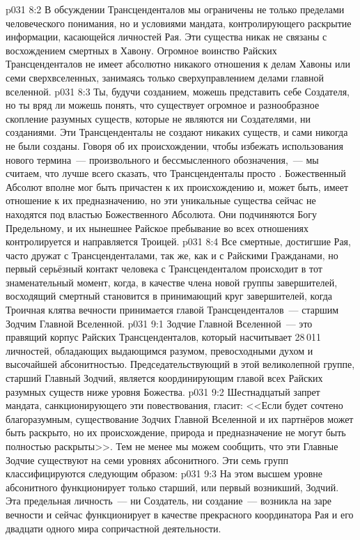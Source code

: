 \vs p031 8:2 В обсуждении Трансценденталов мы ограничены не только пределами человеческого понимания, но и условиями мандата, контролирующего раскрытие информации, касающейся личностей Рая. Эти существа никак не связаны с восхождением смертных в Хавону. Огромное воинство Райских Трансценденталов не имеет абсолютно никакого отношения к делам Хавоны или семи сверхвселенных, занимаясь только сверхуправлением делами главной вселенной.
\vs p031 8:3 Ты, будучи созданием, можешь представить себе Создателя, но ты вряд ли можешь понять, что существует огромное и разнообразное скопление разумных существ, которые не являются ни Создателями, ни созданиями. Эти Трансценденталы не создают никаких существ, и сами никогда не были созданы. Говоря об их происхождении, чтобы избежать использования нового термина~--- произвольного и бессмысленного обозначения,~--- мы считаем, что лучше всего сказать, что Трансценденталы просто . Божественный Абсолют вполне мог быть причастен к их происхождению и, может быть, имеет отношение к их предназначению, но эти уникальные существа сейчас не находятся под властью Божественного Абсолюта. Они подчиняются Богу Предельному, и их нынешнее Райское пребывание во всех отношениях контролируется и направляется Троицей.
\vs p031 8:4 Все смертные, достигшие Рая, часто дружат с Трансценденталами, так же, как и с Райскими Гражданами, но первый серьёзный контакт человека с Трансценденталом происходит в тот знаменательный момент, когда, в качестве члена новой группы завершителей, восходящий смертный становится в принимающий круг завершителей, когда Троичная клятва вечности принимается главой Трансценденталов~--- старшим Зодчим Главной Вселенной.
\vs p031 9:1 Зодчие Главной Вселенной~--- это правящий корпус Райских Трансценденталов, который насчитывает 28\,011 личностей, обладающих выдающимся разумом, превосходными духом и высочайшей абсонитностью. Председательствующий в этой великолепной группе, старший Главный Зодчий, является координирующим главой всех Райских разумных существ ниже уровня Божества.
\vs p031 9:2 Шестнадцатый запрет мандата, санкционирующего эти повествования, гласит: <<Если будет сочтено благоразумным, существование Зодчих Главной Вселенной и их партнёров может быть раскрыто, но их происхождение, природа и предназначение не могут быть полностью раскрыты>>. Тем не менее мы можем сообщить, что эти Главные Зодчие существуют на семи уровнях абсонитного. Эти семь групп классифицируются следующим образом:
\vs p031 9:3  На этом высшем уровне абсонитного функционирует только старший, или первый возникший, Зодчий. Эта предельная личность~--- ни Создатель, ни создание~--- возникла на заре вечности и сейчас функционирует в качестве прекрасного координатора Рая и его двадцати одного мира сопричастной деятельности.
